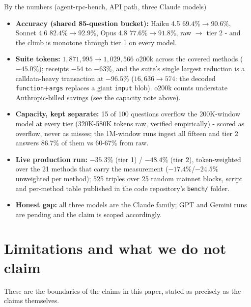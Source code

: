 \documentclass[11pt]{article}
\newcommand{\code}[1]{\texttt{#1}}
\begin{document}
\begin{infobox}{By the numbers (agent-rpc-bench, API path, three Claude models)}
\begin{itemize}[leftmargin=1.4em, itemsep=2pt, topsep=2pt]
\item \textbf{Accuracy (shared 85-question bucket):} Haiku 4.5 $69.4\% \to 90.6\%$, Sonnet 4.6 $82.4\% \to 92.9\%$, Opus 4.8 $77.6\% \to 91.8\%$, raw $\to$ tier 2 - and the climb is monotone through tier 1 on every model.
\item \textbf{Suite tokens:} $1{,}871{,}995 \to 1{,}029{,}566$ o200k across the covered methods ($-45.0\%$); receipts $-54$ to $-63\%$, and the suite's single largest reduction is a calldata-heavy transaction at $-96.5\%$ ($16{,}636 \to 574$: the decoded \code{function}+\code{args} replaces a giant \code{input} blob). o200k counts understate Anthropic-billed savings (see the capacity note above).
\item \textbf{Capacity, kept separate:} 15 of 100 questions overflow the 200K-window model at every tier (320K-580K tokens raw, verified empirically) - scored as overflow, never as misses; the 1M-window runs ingest all fifteen and tier 2 answers 86.7\% of them vs 60-67\% from raw.
\item \textbf{Live production run:} $-35.3\%$ (tier 1) / $-48.4\%$ (tier 2), token-weighted over the 21 methods that carry the measurement ($-17.4\%$/$-24.5\%$ unweighted per method); 525 triples over 25 random mainnet blocks, script and per-method table published in the code repository's \code{bench/} folder.
\item \textbf{Honest gap:} all three models are the Claude family; GPT and Gemini runs are pending and the claim is scoped accordingly.
\end{itemize}
\end{infobox}

\section{Limitations and what we do not claim}

These are the boundaries of the claims in this paper, stated as precisely as the claims themselves.
\end{document}
